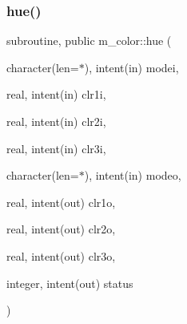 \subsubsection{\texorpdfstring{hue()}{hue()}}
{\footnotesize\ttfamily subroutine, public m\+\_\+color\+::hue (\begin{DoxyParamCaption}\item[{character(len=$\ast$), intent(in)}]{modei,  }\item[{real, intent(in)}]{clr1i,  }\item[{real, intent(in)}]{clr2i,  }\item[{real, intent(in)}]{clr3i,  }\item[{character(len=$\ast$), intent(in)}]{modeo,  }\item[{real, intent(out)}]{clr1o,  }\item[{real, intent(out)}]{clr2o,  }\item[{real, intent(out)}]{clr3o,  }\item[{integer, intent(out)}]{status }\end{DoxyParamCaption})}


